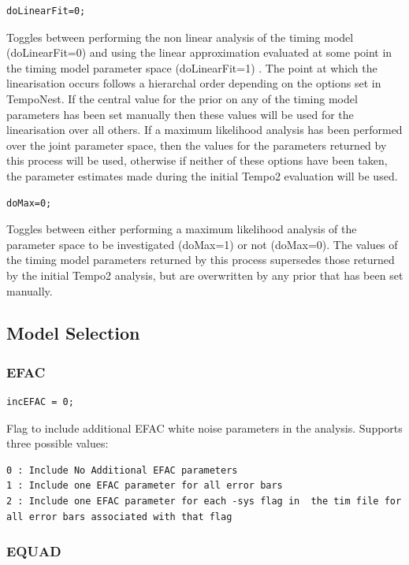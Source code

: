 \documentclass[%
 preprint,
 amsmath,amssymb,amsfonts,
 aps,
]{revtex4-1}
\begin{document}
\begin{lstlisting}
doLinearFit=0;
\end{lstlisting}
%
Toggles between performing the non linear analysis of the timing model (doLinearFit=0) and using the linear approximation evaluated at some point in the timing model parameter space  (doLinearFit=1) .  The point at which the linearisation occurs follows a hierarchal order depending on the options set in TempoNest.  If the central value for the prior on any of the timing model parameters has been set manually then these values will be used for the linearisation over all others.  If a maximum likelihood analysis has been performed over the joint parameter space, then the values for the parameters returned by this process will be used, otherwise if neither of these options have been taken, the parameter estimates made during the initial Tempo2 evaluation will be used.

\begin{lstlisting}
doMax=0;
\end{lstlisting}
%
Toggles between either performing a maximum likelihood analysis of the parameter space to be investigated (doMax=1) or not (doMax=0).  The values of the timing model parameters returned by this process supersedes those returned by the initial Tempo2 analysis, but are overwritten by any prior that has been set manually. 

\subsection{Model Selection}

\subsubsection{EFAC}

\begin{lstlisting}
incEFAC = 0;
\end{lstlisting}

Flag to include additional EFAC white noise parameters in the analysis.  Supports three possible values:

\begin{lstlisting}
0 : Include No Additional EFAC parameters 
1 : Include one EFAC parameter for all error bars
2 : Include one EFAC parameter for each -sys flag in  the tim file for all error bars associated with that flag
\end{lstlisting}


\subsubsection{EQUAD}
\end{document}
